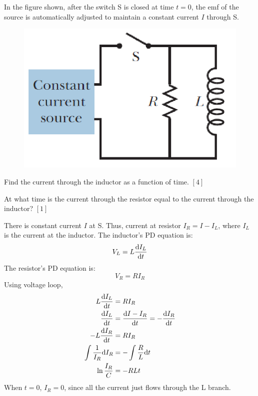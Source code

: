 \begin{problem}
    In the figure shown, after the switch S is closed at time $t = 0$, the emf of the source is automatically adjusted to maintain a constant current $I$ through S.
    \begin{figure}[H]
        \centering
        \includegraphics{spho_book_TYS_images/2021SPhO_4.png}
    \end{figure}
    \begin{subproblemalph}
        \item Find the current through the inductor as
a function of time. \hfill $[4]$
        \item At what time is the current through the
resistor equal to the current through the
inductor? \hfill $[1]$
    \end{subproblemalph} 
\end{problem}

\begin{solution}
    There is constant current $I$ at S. Thus, current at resistor $I_R = I - I_L$, where $I_L$ is the current at the inductor.
    The inductor's PD equation is: 
    \[V_L = L \frac{\mathrm{d} I_L}{\mathrm{d} t}\]
    The resistor's PD equation is:
    \[V_R = R I_R\]
    Using voltage loop, 
    \begin{align}
    L \frac{\mathrm{d} I_L}{\mathrm{d} t} &= R I_R \\
    \frac{\mathrm{d} I_L}{\mathrm{d} t} &= \frac{\mathrm{d} I - I_R}{\mathrm{d} t} = -\frac{\mathrm{d} I_R}{\mathrm{d} t} \\
    -L \frac{\mathrm{d} I_R}{\mathrm{d} t} &= R I_R \\
    \int \frac{1}{I_R} \mathrm{d} I_R &= -\int \frac{R}{L} \mathrm{d} t \\
    \ln{\frac{I_R}{C}} &= -RLt
    \end{align}
    When $t=0$, $I_R = 0$, since all the current just flows through the L branch. 
\end{solution}

